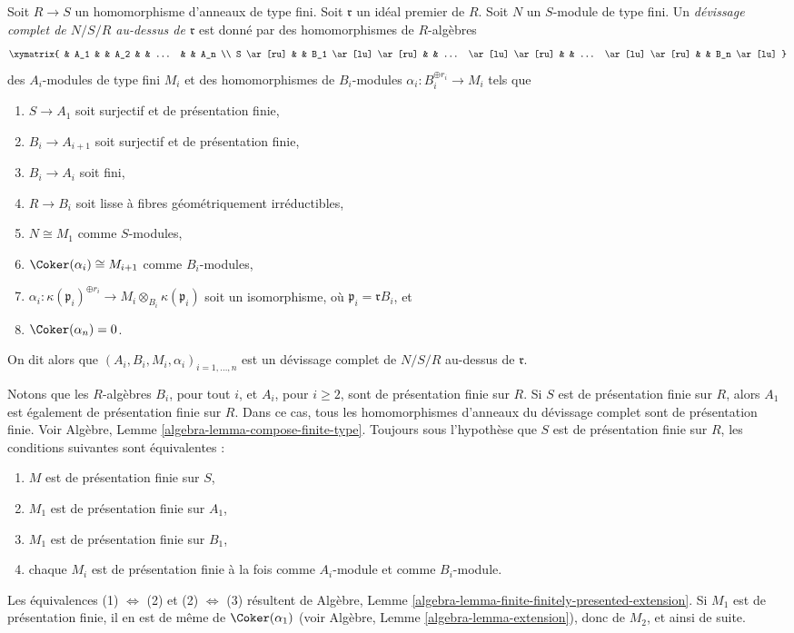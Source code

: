 \begin{definition}
\label{definition-complete-devissage-algebra}
Soit $R \to S$ un homomorphisme d'anneaux de type fini.
Soit $\mathfrak r$ un idéal premier de $R$.
Soit $N$ un $S$-module de type fini.
Un {\it d\'evissage complet de $N/S/R$ au-dessus de $\mathfrak r$}
est donné par des homomorphismes de $R$-algèbres
$$
\xymatrix{
& A_1 & & A_2 & & ... & & A_n \\
S \ar[ru] & & B_1 \ar[lu] \ar[ru] & & ... \ar[lu] \ar[ru] & &
... \ar[lu] \ar[ru] & & B_n \ar[lu]
}
$$
des $A_i$-modules de type fini $M_i$ et des homomorphismes de $B_i$-modules
$\alpha_i : B_i^{\oplus r_i} \to M_i$ tels que
\begin{enumerate}
\item $S \to A_1$ soit surjectif et de présentation finie,
\item $B_i \to A_{i + 1}$ soit surjectif et de présentation finie,
\item $B_i \to A_i$ soit fini,
\item $R \to B_i$ soit lisse à fibres géométriquement irréductibles,
\item $N \cong M_1$ comme $S$-modules,
\item $\Coker(\alpha_i) \cong M_{i + 1}$ comme $B_i$-modules,
\item $\alpha_i : \kappa(\mathfrak p_i)^{\oplus r_i}
\to M_i \otimes_{B_i} \kappa(\mathfrak p_i)$ soit un isomorphisme,
où $\mathfrak p_i = \mathfrak rB_i$, et
\item $\Coker(\alpha_n) = 0$.
\end{enumerate}
On dit alors que
$(A_i, B_i, M_i, \alpha_i)_{i = 1, \ldots, n}$
est un d\'evissage complet de $N/S/R$ au-dessus de $\mathfrak r$.
\end{definition}

\begin{remark}
\label{remark-finite-presentation}
Notons que les $R$-algèbres $B_i$, pour tout $i$, et $A_i$, pour $i \geq 2$,
sont de présentation finie sur $R$. Si $S$ est de présentation finie sur
$R$, alors $A_1$ est également de présentation finie sur
$R$. Dans ce cas, tous les homomorphismes d'anneaux du d\'evissage complet sont de
présentation finie. Voir
Algèbre, Lemme \ref{algebra-lemma-compose-finite-type}.
Toujours sous l'hypothèse que $S$ est de présentation finie sur $R$,
les conditions suivantes sont équivalentes :
\begin{enumerate}
\item $M$ est de présentation finie sur $S$,
\item $M_1$ est de présentation finie sur $A_1$,
\item $M_1$ est de présentation finie sur $B_1$,
\item chaque $M_i$ est de présentation finie à la fois comme $A_i$-module
et comme $B_i$-module.
\end{enumerate}
Les équivalences (1) $\Leftrightarrow$ (2) et (2) $\Leftrightarrow$ (3)
résultent de
Algèbre, Lemme \ref{algebra-lemma-finite-finitely-presented-extension}.
Si $M_1$ est de présentation finie, il en est de même de $\Coker(\alpha_1)$ (voir
Algèbre, Lemme \ref{algebra-lemma-extension}),
donc de $M_2$, et ainsi de suite.
\end{remark}

